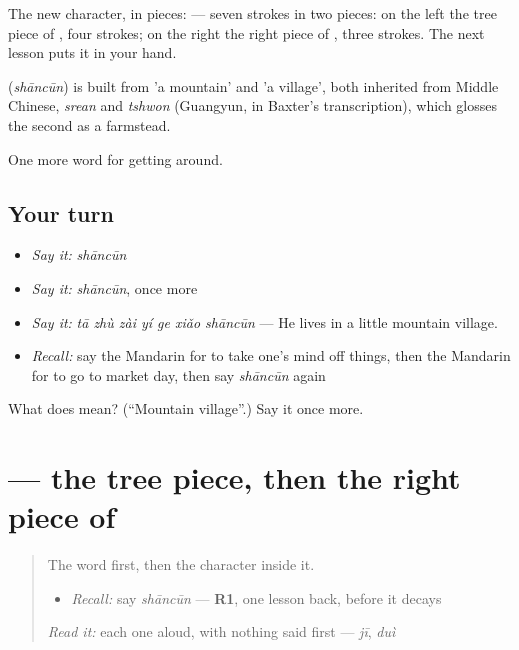 The new character, in pieces:  — seven strokes in two pieces: on the left the tree piece of , four strokes; on the right the right piece of , three strokes. The next lesson puts it in your hand.

\begin{cousinweb}
\textbf{} (\emph{shāncūn}) is built from  'a mountain' and  'a village', both inherited from Middle Chinese, \emph{srean} and \emph{tshwon} (Guangyun, in Baxter's transcription), which glosses the second as a farmstead.
\end{cousinweb}

\begin{grammarlens}[title={What you've built}]
One more word for getting around.
\end{grammarlens}

\subsection*{Your turn}
\begin{itemize}
\raggedright
  \item \emph{Say it:} \emph{shāncūn}
  \item \emph{Say it:} \emph{shāncūn}, once more
  \item \emph{Say it:} \emph{tā zhù zài yí ge xiǎo shāncūn} — He lives in a little mountain village.
  \item \emph{Recall:} say the Mandarin for to take one's mind off things, then the Mandarin for to go to market day, then say \emph{shāncūn} again
\end{itemize}

\begin{tcolorbox}[breakable,colback=teal!4,colframe=teal!35!black,title={Before you move on}]
What does  mean? (\textquotedblleft{}Mountain village\textquotedblright{}.) Say it once more.
\end{tcolorbox}
\section[\texorpdfstring{\zh{村} (cūn)}{村 (cūn)}]{ — the tree piece, then the right piece of }

\label{lesson:ZH-W440-cun-village}



\begin{quote}
The word first, then the character inside it.

\begin{itemize}
\raggedright
  \item \emph{Recall:} say \emph{shāncūn} — \textbf{R1}, one lesson back, before it decays
\end{itemize}

\begin{quote}
 
\end{quote}

\emph{Read it:} each one aloud, with nothing said first — \emph{jī}, \emph{duì}
\end{quote}

